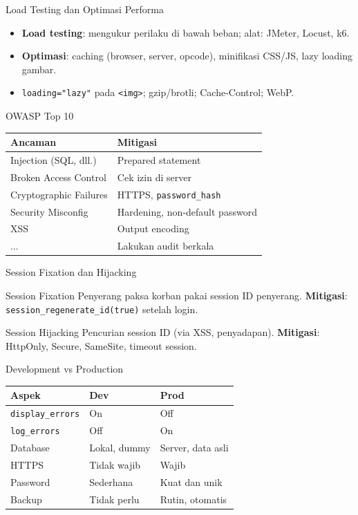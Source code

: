 \documentclass[handout]{beamer}
\begin{document}
\begin{frame}{Load Testing dan Optimasi Performa}
	\begin{itemize}
		\item \textbf{Load testing}: mengukur perilaku di bawah beban; alat: JMeter, Locust, k6.
		\item \textbf{Optimasi}: caching (browser, server, opcode), minifikasi CSS/JS, lazy loading gambar.
		\item \texttt{loading="lazy"} pada \texttt{<img>}; gzip/brotli; Cache-Control; WebP.
	\end{itemize}
\end{frame}

\begin{frame}{OWASP Top 10}
	\small
	\begin{tabular}{|l|l|}
		\hline
		\textbf{Ancaman} & \textbf{Mitigasi} \\
		\hline
		Injection (SQL, dll.) & Prepared statement \\
		\hline
		Broken Access Control & Cek izin di server \\
		\hline
		Cryptographic Failures & HTTPS, \texttt{password\_hash} \\
		\hline
		Security Misconfig & Hardening, non-default password \\
		\hline
		XSS & Output encoding \\
		\hline
		... & Lakukan audit berkala \\
		\hline
	\end{tabular}
\end{frame}

\begin{frame}{Session Fixation dan Hijacking}
	\begin{block}{Session Fixation}
		Penyerang paksa korban pakai session ID penyerang. \textbf{Mitigasi}: \texttt{session\_regenerate\_id(true)} setelah login.
	\end{block}
	\begin{block}{Session Hijacking}
		Pencurian session ID (via XSS, penyadapan). \textbf{Mitigasi}: HttpOnly, Secure, SameSite, timeout session.
	\end{block}
\end{frame}

\begin{frame}{Development vs Production}
	\begin{tabular}{|l|l|l|}
		\hline
		\textbf{Aspek} & \textbf{Dev} & \textbf{Prod} \\
		\hline
		\texttt{display\_errors} & On & Off \\
		\hline
		\texttt{log\_errors} & Off & On \\
		\hline
		Database & Lokal, dummy & Server, data asli \\
		\hline
		HTTPS & Tidak wajib & Wajib \\
		\hline
		Password & Sederhana & Kuat dan unik \\
		\hline
		Backup & Tidak perlu & Rutin, otomatis \\
		\hline
	\end{tabular}
\end{frame}
\end{document}
